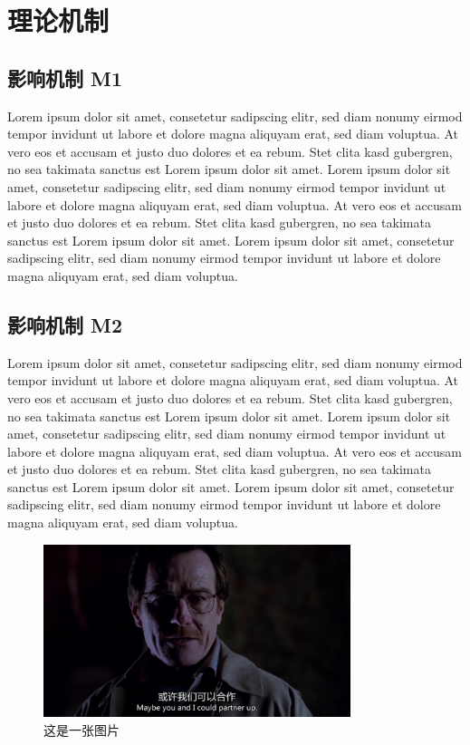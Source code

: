 \documentclass[]{WTUthesis}
\begin{document}
	\chapter{理论机制}
	
	\section{影响机制 M1}
	
	Lorem ipsum dolor sit amet, consetetur sadipscing elitr, sed diam nonumy eirmod tempor invidunt ut labore et dolore magna aliquyam erat, sed diam voluptua. At vero eos et accusam et justo duo dolores et ea rebum. Stet clita kasd gubergren, no sea takimata sanctus est Lorem ipsum dolor sit amet. Lorem ipsum dolor sit amet, consetetur sadipscing elitr, sed diam nonumy eirmod tempor invidunt ut labore et dolore magna aliquyam erat, sed diam voluptua. At vero eos et accusam et justo duo dolores et ea rebum. Stet clita kasd gubergren, no sea takimata sanctus est Lorem ipsum dolor sit amet. Lorem ipsum dolor sit amet, consetetur sadipscing elitr, sed diam nonumy eirmod tempor invidunt ut labore et dolore magna aliquyam erat, sed diam voluptua.
	
	\newpage
	
	\section{影响机制 M2}
	
	Lorem ipsum dolor sit amet, consetetur sadipscing elitr, sed diam nonumy eirmod tempor invidunt ut labore et dolore magna aliquyam erat, sed diam voluptua. At vero eos et accusam et justo duo dolores et ea rebum. Stet clita kasd gubergren, no sea takimata sanctus est Lorem ipsum dolor sit amet. Lorem ipsum dolor sit amet, consetetur sadipscing elitr, sed diam nonumy eirmod tempor invidunt ut labore et dolore magna aliquyam erat, sed diam voluptua. At vero eos et accusam et justo duo dolores et ea rebum. Stet clita kasd gubergren, no sea takimata sanctus est Lorem ipsum dolor sit amet. Lorem ipsum dolor sit amet, consetetur sadipscing elitr, sed diam nonumy eirmod tempor invidunt ut labore et dolore magna aliquyam erat, sed diam voluptua.
	
	\begin{figure}[!ht]
		\centering
		\includegraphics[width=0.8\textwidth]{./white.png}
		\caption{这是一张图片}
		\label{fig_white}
	\end{figure}
	
\end{document}
